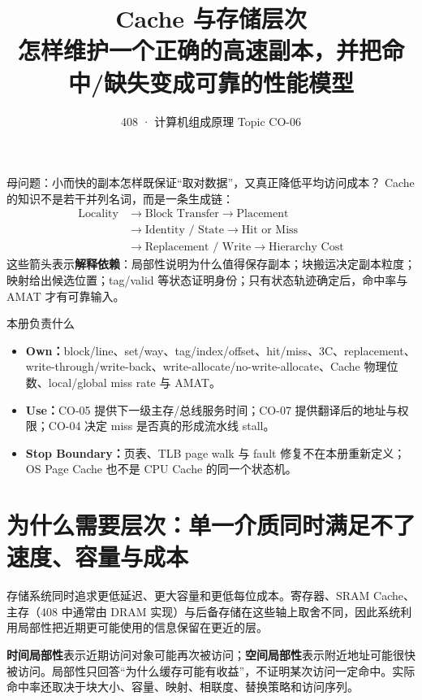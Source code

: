 \documentclass[UTF8,fontset=fandol,11pt,a4paper]{ctexart}
\title{\vspace{-1.1cm}\textbf{Cache 与存储层次}\\[0.4em]\large 怎样维护一个正确的高速副本，并把命中/缺失变成可靠的性能模型}
\author{408 · 计算机组成原理 Topic CO-06}\date{}
\newcommand{\kw}[1]{\textbf{\color{deep}#1}}\newcommand{\code}[1]{\texttt{#1}}
\begin{document}
\maketitle

\begin{corebox}{母问题：小而快的副本怎样既保证“取对数据”，又真正降低平均访问成本？}
Cache 的知识不是若干并列名词，而是一条生成链：
\[
\boxed{
\begin{aligned}
\text{Locality}
&\to\text{Block Transfer}\to\text{Placement}\\
&\to\text{Identity / State}\to\text{Hit or Miss}\\
&\to\text{Replacement / Write}\to\text{Hierarchy Cost}
\end{aligned}}
\]
这些箭头表示\textbf{解释依赖}：局部性说明为什么值得保存副本；块搬运决定副本粒度；映射给出候选位置；tag/valid 等状态证明身份；只有状态轨迹确定后，命中率与 AMAT 才有可靠输入。
\end{corebox}

\begin{methodbox}{本册负责什么}
\begin{itemize}
\item \kw{Own：}block/line、set/way、tag/index/offset、hit/miss、3C、replacement、write-through/write-back、write-allocate/no-write-allocate、Cache 物理位数、local/global miss rate 与 AMAT。
\item \kw{Use：}CO-05 提供下一级主存/总线服务时间；CO-07 提供翻译后的地址与权限；CO-04 决定 miss 是否真的形成流水线 stall。
\item \kw{Stop Boundary：}页表、TLB page walk 与 fault 修复不在本册重新定义；OS Page Cache 也不是 CPU Cache 的同一个状态机。
\end{itemize}
\end{methodbox}

\tableofcontents\newpage

\section{为什么需要层次：单一介质同时满足不了速度、容量与成本}
存储系统同时追求更低延迟、更大容量和更低每位成本。寄存器、SRAM Cache、主存（408 中通常由 DRAM 实现）与后备存储在这些轴上取舍不同，因此系统利用局部性把近期更可能使用的信息保留在更近的层。

\kw{时间局部性}表示近期访问对象可能再次被访问；\kw{空间局部性}表示附近地址可能很快被访问。局部性只回答“为什么缓存可能有收益”，不证明某次访问一定命中。实际命中率还取决于块大小、容量、映射、相联度、替换策略和访问序列。
\end{document}
